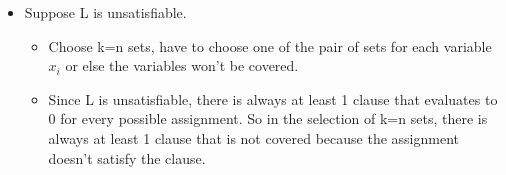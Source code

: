 \documentclass[letterpaper]{article}
\begin{document}
\begin{itemize}
\begin{itemize}
          \item Suppose L is unsatisfiable.
                \begin{itemize}
                  \item Choose k=n sets, have to choose one of the pair of sets
                        for each variable $x_i$ or else the variables won't be covered.
                  \item Since L is unsatisfiable, there is always at least 1 clause that
                        evaluates to 0 for every possible assignment. So in the selection
                        of k=n sets, there is always at least 1 clause that is not covered
                        because the assignment doesn't satisfy the clause.
                \end{itemize}
        \end{itemize}
\end{itemize}
\end{document}
